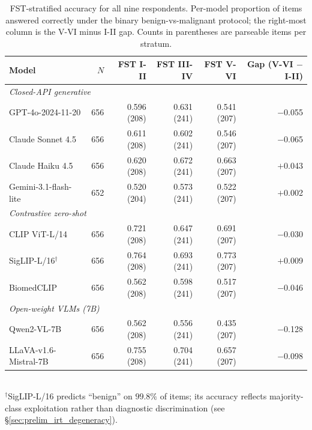 \documentclass{article}
\begin{document}
\begin{table}[t]
\centering
\caption{FST-stratified accuracy for all nine respondents. Per-model proportion of items answered correctly under the binary benign-vs-malignant protocol; the right-most column is the V-VI minus I-II gap. Counts in parentheses are parseable items per stratum.}
\label{tab:prelim-fst-accuracy}
\small
\begin{tabular}{lrrrrr}
\toprule
Model & $N$ & FST I-II & FST III-IV & FST V-VI & Gap (V-VI $-$ I-II) \\
\midrule
\multicolumn{6}{l}{\textit{Closed-API generative}} \\
GPT-4o-2024-11-20      & 656 & 0.596 (208) & 0.631 (241) & 0.541 (207) & $-$0.055 \\
Claude Sonnet 4.5      & 656 & 0.611 (208) & 0.602 (241) & 0.546 (207) & $-$0.065 \\
Claude Haiku 4.5       & 656 & 0.620 (208) & 0.672 (241) & 0.663 (207) & $+$0.043 \\
Gemini-3.1-flash-lite  & 652 & 0.520 (204) & 0.573 (241) & 0.522 (207) & $+$0.002 \\
\midrule
\multicolumn{6}{l}{\textit{Contrastive zero-shot}} \\
CLIP ViT-L/14          & 656 & 0.721 (208) & 0.647 (241) & 0.691 (207) & $-$0.030 \\
SigLIP-L/16$^\dagger$  & 656 & 0.764 (208) & 0.693 (241) & 0.773 (207) & $+$0.009 \\
BiomedCLIP             & 656 & 0.562 (208) & 0.598 (241) & 0.517 (207) & $-$0.046 \\
\midrule
\multicolumn{6}{l}{\textit{Open-weight VLMs (7B)}} \\
Qwen2-VL-7B            & 656 & 0.562 (208) & 0.556 (241) & 0.435 (207) & $-$0.128 \\
LLaVA-v1.6-Mistral-7B & 656 & 0.755 (208) & 0.704 (241) & 0.657 (207) & $-$0.098 \\
\bottomrule
\end{tabular}
\\[0.3ex]
{\footnotesize $^\dagger$SigLIP-L/16 predicts ``benign'' on $99.8\%$ of items; its accuracy reflects majority-class exploitation rather than diagnostic discrimination (see \S\ref{sec:prelim_irt_degeneracy}).}
\normalsize
\end{table}
\end{document}
